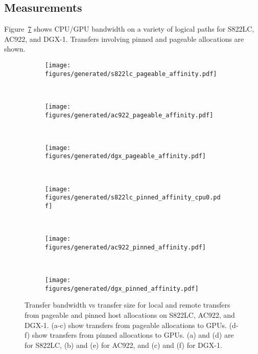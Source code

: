 \subsection{Measurements}

Figure~\ref{fig:cpu-gpu-affinity-direction} shows CPU/GPU bandwidth on a variety of logical paths for S822LC, AC922, and DGX-1.
Transfers involving pinned and pageable allocations are shown.

\begin{figure}[ht]
	\centering
	\begin{subfigure}[b]{0.31\textwidth}
		\texttt{[image: figures/generated/s822lc\_pageable\_affinity.pdf]}
		\caption{}
		\label{fig:minsky_pageable_affinity}
	\end{subfigure}
	~
	\begin{subfigure}[b]{0.31\textwidth}
		\texttt{[image: figures/generated/ac922\_pageable\_affinity.pdf]}
		\caption{}
		\label{fig:hal_pageable_affinity}
	\end{subfigure}
	~
	\begin{subfigure}[b]{0.31\textwidth}
		\texttt{[image: figures/generated/dgx\_pageable\_affinity.pdf]}
		\caption{}
		\label{fig:dgx_pageable_affinity}
	\end{subfigure}
	\\
	\begin{subfigure}[b]{0.31\textwidth}
		\texttt{[image: figures/generated/s822lc\_pinned\_affinity\_cpu0.pdf]}
		\caption{}
		\label{fig:minsky_pinned_affinity}
	\end{subfigure}
	~
	\begin{subfigure}[b]{0.31\textwidth}
		\texttt{[image: figures/generated/ac922\_pinned\_affinity.pdf]}
		\caption{}
		\label{fig:hal_pinned_affinity}
	\end{subfigure}
	~
	\begin{subfigure}[b]{0.31\textwidth}
		\texttt{[image: figures/generated/dgx\_pinned\_affinity.pdf]}
		\caption{}
		\label{fig:dgx_pinned_affinity}
		
	\end{subfigure}
	\caption[CPU-GPU affinity and \texttt{cudaMemcpy} bandwidth]{
		Transfer bandwidth vs transfer size for local and remote transfers from pageable and pinned host allocations on S822LC, AC922, and DGX-1.
		(a-c) show transfers from pageable allocations to GPUs.
		(d-f) show transfers from pinned allocations to GPUs.
		(a) and (d) are for S822LC, (b) and (e) for AC922, and (c) and (f) for DGX-1.
	}
	\label{fig:cpu-gpu-affinity-direction}
\end{figure}

